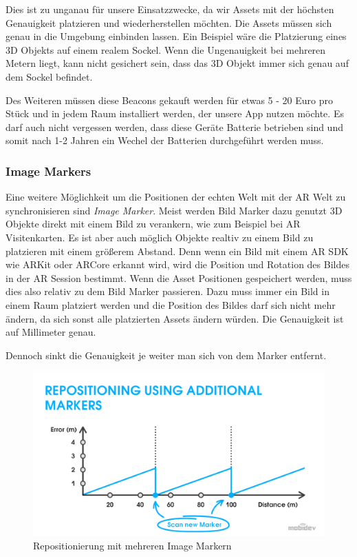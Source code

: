 \documentclass[titlepage, a4paper, 11pt]{scrartcl}
\begin{document}
  Dies ist zu unganau für unsere Einsatzzwecke, da wir Assets mit der höchsten Genauigkeit platzieren und wiederherstellen möchten. Die Assets müssen sich genau in die Umgebung einbinden lassen.
  Ein Beispiel wäre die Platzierung eines 3D Objekts auf einem realem Sockel. Wenn die Ungenauigkeit bei mehreren Metern liegt, kann nicht gesichert sein, dass das 3D Objekt immer sich genau auf dem Sockel befindet.

  Des Weiteren müssen diese Beacons gekauft werden für etwas 5 - 20 Euro pro Stück und in jedem Raum installiert werden, der unsere App nutzen möchte.
  Es darf auch nicht vergessen werden, dass diese Geräte Batterie betrieben sind und somit nach 1-2 Jahren ein Wechel der Batterien durchgeführt werden muss. 

  \subsubsection{Image Markers}

  Eine weitere Möglichkeit um die Positionen der echten Welt mit der AR Welt zu synchronisieren sind \textit{Image Marker}. Meist werden Bild Marker dazu genutzt 3D Objekte direkt mit einem Bild zu verankern, wie zum Beispiel bei AR Visitenkarten.
  Es ist aber auch möglich Objekte realtiv zu einem Bild zu platzieren mit einem größerem Abstand. Denn wenn ein Bild mit einem AR SDK wie ARKit oder ARCore erkannt wird, wird die Position und Rotation des Bildes in der AR Session bestimmt.
  Wenn die Asset Positionen gespeichert werden, muss dies also relativ zu dem Bild Marker passieren. Dazu muss immer ein Bild in einem Raum platziert werden und die Position des Bildes darf sich nicht mehr ändern, da sich sonst alle platzierten Assets ändern würden.
  Die Genauigkeit ist auf Millimeter genau. \cite{HowAugme98:online}
  
  Dennoch sinkt die Genauigkeit je weiter man sich von dem Marker entfernt.

  \begin{figure}[h]
    \centering
    \includegraphics[width=.6\textwidth]{multi-marker}
    \caption{Repositionierung mit mehreren Image Markern \cite{HowAugme98:online}}
    \label{MultiMarker}
  \end{figure}
\end{document}
